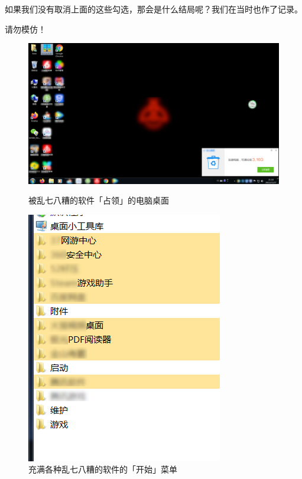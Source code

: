 {{如果我们没有取消上面的这些勾选，那会是什么结局呢？我们在当时也作了记录。

\begin{danger}
  请勿模仿！
\end{danger}

\begin{figure}[htb!]
  \centering
  \begin{minipage}{.65\textwidth}
    \centering
    \includegraphics[width=.9\textwidth]{assets/basic/Computer_with_unwanted_software.png}
    \caption{被乱七八糟的软件「占领」的电脑桌面}
    \label{fig:Computer_with_unwanted_software}
  \end{minipage}
  \begin{minipage}{.34\textwidth}
    \centering
    \includegraphics[width=.9\textwidth]{assets/basic/Computer_with_unwanted_software_2.png}
    \caption{充满各种乱七八糟的软件的「开始」菜单}
    \label{fig:Computer_with_unwanted_software_2}
  \end{minipage} 
\end{figure}

}}
